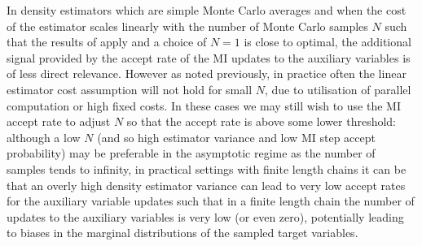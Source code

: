 In density estimators which are simple Monte Carlo averages and when the cost of the estimator scales linearly with the number of Monte Carlo samples $N$ such that the results of \citep{sherlock2016pseudo} apply and a choice of $N=1$ is close to optimal, the additional signal provided by the accept rate of the \ac{MI} updates to the auxiliary variables is of less direct relevance. However as noted previously, in practice often the linear estimator cost assumption will not hold for small $N$, due to utilisation of parallel computation or high fixed costs. In these cases we may still wish to use the \ac{MI} accept rate to adjust $N$ so that the accept rate is above some lower threshold: although a low $N$ (and so high estimator variance and low \ac{MI} step accept probability) may be preferable in the asymptotic regime as the number of samples tends to infinity, in practical settings with finite length chains it can be that an overly high density estimator variance can lead to very low accept rates for the auxiliary variable updates such that in a finite length chain the number of updates to the auxiliary variables is very low (or even zero), potentially leading to biases in the marginal distributions of the sampled target variables. %



